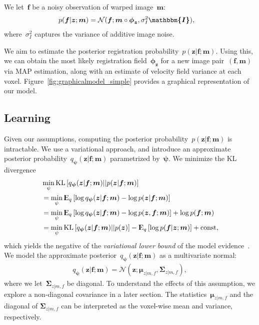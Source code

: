 \documentclass{article}
\newcommand{\bmu}{\boldsymbol{\mu}}
\newcommand{\bphi}{\boldsymbol{\phi}}
\newcommand{\bpsi}{\boldsymbol{\psi}}
\newcommand{\bSigma}{\boldsymbol{\Sigma}}
\newcommand{\KL}{\text{KL}}
\newcommand{\bz}{\boldsymbol{z}}
\newcommand{\bmoving}{\boldsymbol{m}}
\newcommand{\bfixed}{\boldsymbol{f}}
\newcommand{\moving}{m}
\newcommand{\fixed}{f}
\newcommand{\Expect}{{\rm I\kern-.3em E}}
\newcommand{\citep}{\cite}
\begin{document}
We let~$\bfixed$ be a noisy observation of warped image~$\bmoving$:
\begin{align}
	p(\bfixed | \bz ; \bmoving) &= \mathcal{N}(\bfixed ; \bmoving \circ \bphi_{\bz}, \sigma_I^2\boldsymbol{\mathbbm{I}}),  \label{eq:likelihood}
\end{align}
where~$\sigma_I^2$ captures the variance of additive image noise.

We aim to estimate the posterior registration probability~$p(\bz|\bfixed;\bmoving)$. Using this, we can obtain the most likely registration field~$\bphi_{\bz}$ for a new image pair~$(\bfixed, \bmoving)$ via MAP estimation, along with an estimate of velocity field variance at each voxel. Figure~\ref{fig:graphicalmodel_simple} provides a graphical representation of our model. 



\vspace{-0.1cm}
\subsection{Learning}


Given our assumptions, computing the posterior probability~$p(\bz|\bfixed; \bmoving)$ is intractable. We use a variational approach, and introduce an approximate posterior probability~$q_{\bpsi}(\bz|\bfixed; \bmoving)$ parametrized by~$\bpsi$. We minimize the KL divergence
\begin{align}
&\min_{\psi} \KL \left[q_{\bpsi}(\bz|\bfixed ; \bmoving) || p(\bz|\bfixed ; \bmoving)  \right] \nonumber \\
&= \min_{\psi} \Expect_{q} \left[ \log q_{\bpsi}(\bz|\bfixed ; \bmoving) - \log p(\bz|\bfixed ; \bmoving) \right] \nonumber \\
&= \min_{\psi} \Expect_{q} \left[ \log q_{\bpsi}(\bz|\bfixed ; \bmoving) - \log p(\bz, \bfixed; \bmoving) \right] + \log p(\bfixed ; \bmoving) \nonumber \\
&= \min_{\psi} \KL \left[  q_{\bpsi}(\bz|\bfixed; \bmoving) ||  p(\bz)  \right] - \Expect_{q} \left[ \log p(\bfixed | \bz ; \bmoving) \right] + \text{const},
\label{eq:VLB}
\end{align}
which yields the negative of the \textit{variational lower bound} of the model evidence~\citep{kingma2013}.
We model the approximate posterior~$q_{\bpsi}(\bz | \bfixed ; \bmoving)$ as a multivariate normal:
\begin{align}
q_{\bpsi}(\bz | \bfixed ; \bmoving) = \mathcal{N}(\bz ; \bmu_{z | \moving, \fixed}, \bSigma_{z |\moving, \fixed}),
\end{align}
where we let~$\bSigma_{z | \moving, \fixed}$ be diagonal. To understand the effects of this assumption, we explore a non-diagonal covariance in a later section. The statistics~$\bmu_{z | \moving, \fixed}$ and the diagonal of $\bSigma_{z |\moving, \fixed}$ can be interpreted as the voxel-wise mean and variance, respectively. 
\end{document}
